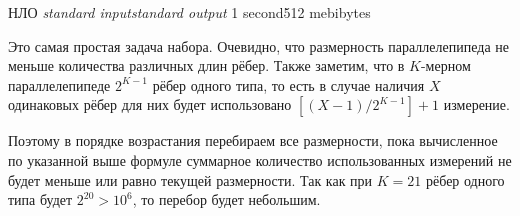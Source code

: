 \begin{problem}{НЛО}
{\textsl{standard input}}{\textsl{standard output}}
{1 second}{512 mebibytes}{}

Это самая простая задача набора.
Очевидно, что размерность параллелепипеда не меньше количества
различных длин рёбер.
Также заметим, что в $K$-мерном параллелепипеде $2^{K-1}$ рёбер одного типа,
то есть в случае наличия $X$ одинаковых рёбер для них будет использовано
$[(X-1)/2^{K-1}]+1$ измерение.

Поэтому в порядке возрастания перебираем все размерности,
пока вычисленное по указанной выше формуле суммарное количество
использованных измерений не будет меньше или равно текущей размерности.
Так как при $K=21$ рёбер одного типа будет $2^{20}>10^6$,
то перебор будет небольшим.

\end{problem}
